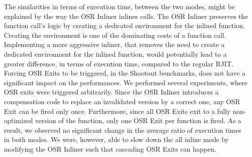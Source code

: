 The similarities in terms of execution time, between the two modes, might be explained by the way the OSR Inliner inlines calls.
The OSR Inliner preserves the function call's logic by creating a dedicated environment for the inlined function.
Creating the environment is one of the dominating costs of a function call.
Implementing a more aggressive inliner, that removes the need to create a dedicated environment for the inlined function, would potentially lead to a greater difference, in terms of execution time, compared to the regular RJIT.\\

Forcing OSR Exits to be triggered, in the Shootout benchmarks, does not have a significant impact on the performances.
We performed several experiments, where OSR exits were triggered arbitrarily.
Since the OSR Inliner introduces a compensation code to replace an invalidated version by a correct one, any OSR Exit can be fired only once.
Furthermore, since all OSR Exits exit to a fully non-optimized version of the function, only one OSR Exit per function is fired.
As a result, we observed no significant change in the average ratio of execution times in both modes.
We were, however, able to slow down the all inline mode by modifying the OSR Inliner such that cascading OSR Exits can happen.\\ 

